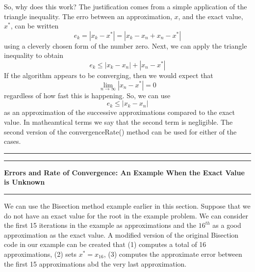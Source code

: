 \documentclass[10pt,fleqn]{article}
\begin{document}
So, why does this work? The justification comes from a simple application of the
triangle inequality. The erro between an approximation, $x$, and the exact
value, $x^*$, can be written
$$
  e_k = | x_k - x^* | = | x_k - x_n + x_n - x^* |
$$
using a cleverly chosen form of the number zero. Next, we can apply the triangle
inequality to obtain
$$
  e_k \leq  | x_k - x_n | + | x_n - x^* |
$$
If the algorithm appears to be converging, then we would expect that
$$
  \lim_{n\rightarrow\infty}  | x_n - x^* | = 0
$$
regardless of how fast this is happening. So, we can use
$$
  e_k \leq  | x_k - x_n |
$$
as an approximation of the successive approximations compared to the exact
value. In matheamtical terms we say that the second term is negligible. The
second version of the convergenceRate() method can be used for either of the
cases.
\vskip0.1in\hrule\vskip0.1in
\newpage
\vskip0.1in\hrule\vskip0.1in
\noindent
{\bf Errors and Rate of Convergence: An Example When the Exact Value is Unknown}
\vskip0.1in\hrule\vskip0.1in
We can use the Bisection method example earlier in this section. Suppose that we
do not have an exact value for the root in the example problem. We can consider
the first 15 iterations in the example as approximations and the $16^{th}$ as a
good approximation as the exact value.  A modified version of the original
Bisection code in our example can be created that (1) computes a total of 16
approximations, (2) sets $x^*=x_{16}$, (3) computes the approximate error
between the first 15 approximations abd the very last approximation.
\end{document}
